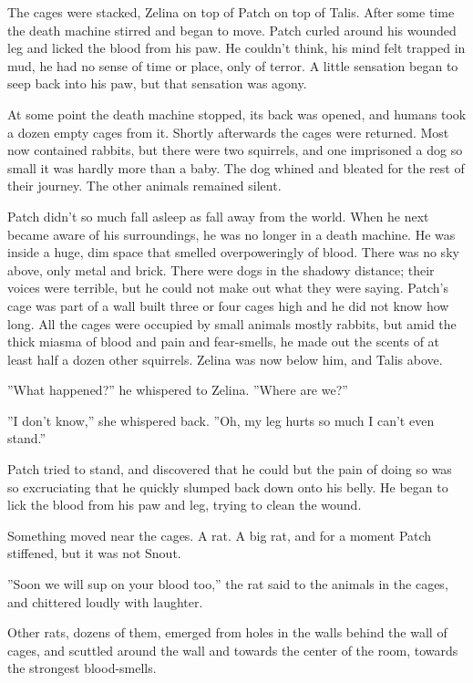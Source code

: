 \documentclass[11pt]{article}
\begin{document}
 The cages were stacked, Zelina on top of Patch on top of Talis. After some time the death machine stirred and began to move. Patch curled around his wounded leg and licked the blood from his paw. He couldn't think, his mind felt trapped in mud, he had no sense of time or place, only of terror. A little sensation began to seep back into his paw, but that sensation was agony.\par
At some point the death machine stopped, its back was opened, and humans took a dozen empty cages from it. Shortly afterwards the cages were returned. Most now contained rabbits, but there were two squirrels, and one imprisoned a dog so small it was hardly more than a baby. The dog whined and bleated for the rest of their journey. The other animals remained silent.\par
 Patch didn't so much fall asleep as fall away from the world. When he next became aware of his surroundings, he was no longer in a death machine. He was inside a huge, dim space that smelled overpoweringly of blood. There was no sky above, only metal and brick. There were dogs in the shadowy distance; their voices were terrible, but he could not make out what they were saying. Patch's cage was part of a wall built three or four cages high and he did not know how long. All the cages were occupied by small animals %
 mostly rabbits, but amid the thick miasma of blood and pain and fear-smells, he made out the scents of at least half a dozen other squirrels. Zelina was now below him, and Talis above.\par
 ''What happened?'' he whispered to Zelina. ''Where are we?''\par
 ''I don't know,'' she whispered back. ''Oh, my leg hurts so much I can't even stand.''\par
 Patch tried to stand, and discovered that he could %
 but the pain of doing so was so excruciating that he quickly slumped back down onto his belly. He began to lick the blood from his paw and leg, trying to clean the wound.\par
 Something moved near the cages. A rat. A big rat, and for a moment Patch stiffened, but it was not Snout.\par
 ''Soon we will sup on your blood too,'' the rat said to the animals in the cages, and chittered loudly with laughter.\par
 Other rats, dozens of them, emerged from holes in the walls behind the wall of cages, and scuttled around the wall and towards the center of the room, towards the strongest blood-smells.\par
\end{document}
